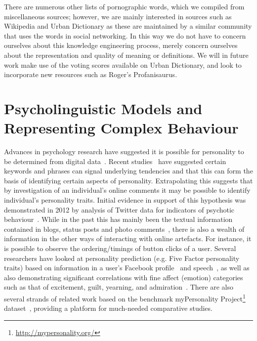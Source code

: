 \documentclass{AISB2008}
\begin{document}
There are numerous other lists of pornographic words, which we
compiled from miscellaneous sources; however, we are mainly interested
in sources such as Wikipedia and Urban Dictionary as these are
maintained by a similar community that uses the words in social
networking. In this way we do not have to concern ourselves about this
knowledge engineering process, merely concern ourselves about the
representation and quality of meaning or definitions. We will in
future work make use of the voting scores available on Urban
Dictionary, and look to incorporate new resources such as Roger's
Profanisaurus.


\section{Psycholinguistic Models and Representing Complex Behaviour}

Advances in psychology research have suggested it is possible for
personality to be determined from digital
data~\cite{pennebaker+king:1999,vazire+gosling:2004,iacobelli-et-al:2011}.
Recent studies~\cite{woodworth-et-al:2012} have suggested certain
keywords and phrases can signal underlying tendencies and that this
can form the basis of identifying certain aspects of personality.
Extrapolating this suggests that by investigation of an individual's
online comments it may be possible to identify individual's
personality traits. Initial evidence in support of this hypothesis was
demonstrated in 2012 by analysis of Twitter data for indicators of
psychotic behaviour~\cite{sumner-et-al:2012}. While in the past this
has mainly been the textual information contained in blogs, status
posts and photo comments~\cite{blamey-et-al-2012,blamey-et-al-2013},
there is also a wealth of information in the other ways of interacting
with online artefacts. For instance, it is possible to observe the
ordering/timings of button clicks of a user. Several researchers have
looked at personality prediction (e.g. Five Factor personality traits)
based on information in a user's Facebook
profile~\cite{back-et-al:2010,golbeck-et-al:2001} and
speech~\cite{chung+pennebaker:2007,tausczik+pennebaker:2010}, as well
as also demonstrating significant correlations with fine affect
(emotion) categories such as that of excitement, guilt, yearning, and
admiration~\cite{mohammad+kiritchenko:2013}. There are also several
strands of related work based on the benchmark myPersonality
Project\footnote{\url{http://mypersonality.org/}}
dataset~\cite{celli-et-al:2013}, providing a platform for much-needed
comparative studies.
\end{document}
